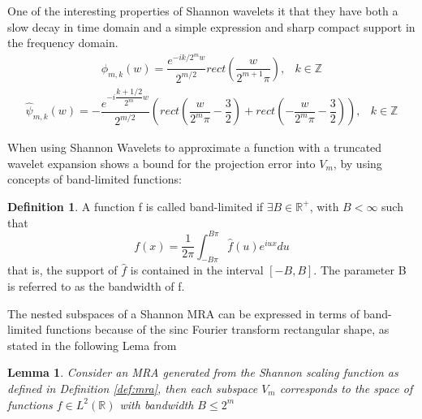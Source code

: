 \documentclass[12,twoside]{mammeTFM}
\newtheorem{lem}[thm]{Lemma}
\theoremstyle{definition}
\newtheorem{definition}[thm]{Definition}
\theoremstyle{remark}
\newcommand{\Z}{\ensuremath{\mathbb{Z}}}
\newcommand{\R}{\ensuremath{\mathbb{R}}}
\begin{document}
One of the interesting properties of Shannon wavelets it that they have both a slow decay in time domain and a simple expression and sharp compact support in the frequency domain.
\begin{equation} \label{eq:sharp_freq}
\begin{array}{rcl}
\hat{\phi}_{m,k}(w) = \dfrac{e^{-i k/2^m w}}{2^{m/2}}rect \left(\dfrac{w}{2^{m+1}\pi}\right), & k \in \Z
\end{array}
\end{equation}
\begin{equation}
\begin{array}{rcl}
\hat{\psi}_{m,k}(w) = -\dfrac{e^{-i \dfrac{k + 1/2}{2^m} w}}{2^{m/2}} \left(rect \left(\dfrac{w}{2^{m}\pi} - \dfrac{3}{2}\right) + rect \left(-\dfrac{w}{2^{m}\pi} - \dfrac{3}{2}\right) \right), & k \in \Z
\end{array}
\end{equation}

When using Shannon Wavelets to approximate a function with a truncated wavelet expansion \cite{mar17} shows a bound for the projection error into $V_m$, by using concepts of band-limited functions:

\begin{definition} A function f is called band-limited if $\exists B \in \R^+$, with $B < \infty$ such that
\begin{equation}
f(x) = \dfrac{1}{2\pi} \int_{-B \pi}^{B \pi} \hat{f}(u) e^{iu x}du 
\end{equation}
that is, the support of $\hat{f}$ is contained in the interval $[-B, B]$. The parameter B is referred to as the bandwidth of f.
\end{definition}

The nested subspaces of a Shannon MRA can be expressed in terms of band-limited functions because of the sinc Fourier transform rectangular shape, as stated in the following Lema from \cite{ste11}

\begin{lem} Consider an MRA generated from the Shannon scaling function as defined in Definition \ref{def:mra}, then each subspace $V_m$ corresponds to the space of functions $f \in L^2(\R)$ with bandwidth $B \leq 2^m$
\end{lem}
\end{document}
